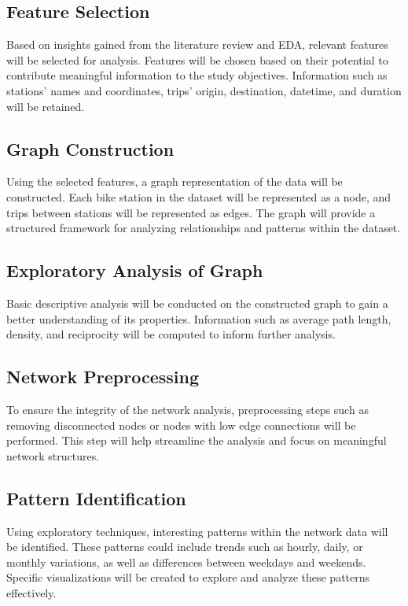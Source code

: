 \documentclass[conference]{IEEEtran}
\begin{document}
\subsection{Feature Selection}
Based on insights gained from the literature review and EDA, relevant features will be selected for analysis. Features will be chosen based on their potential to contribute meaningful information to the study objectives. Information such as stations' names and coordinates, trips' origin, destination, datetime, and duration will be retained.

\subsection{Graph Construction}
Using the selected features, a graph representation of the data will be constructed. Each bike station in the dataset will be represented as a node, and trips between stations will be represented as edges. The graph will provide a structured framework for analyzing relationships and patterns within the dataset.

\subsection{Exploratory Analysis of Graph}
Basic descriptive analysis will be conducted on the constructed graph to gain a better understanding of its properties. Information such as average path length, density, and reciprocity will be computed to inform further analysis.

\subsection{Network Preprocessing}
To ensure the integrity of the network analysis, preprocessing steps such as removing disconnected nodes or nodes with low edge connections will be performed. This step will help streamline the analysis and focus on meaningful network structures.

\subsection{Pattern Identification}
Using exploratory techniques, interesting patterns within the network data will be identified. These patterns could include trends such as hourly, daily, or monthly variations, as well as differences between weekdays and weekends. Specific visualizations will be created to explore and analyze these patterns effectively.
\end{document}
